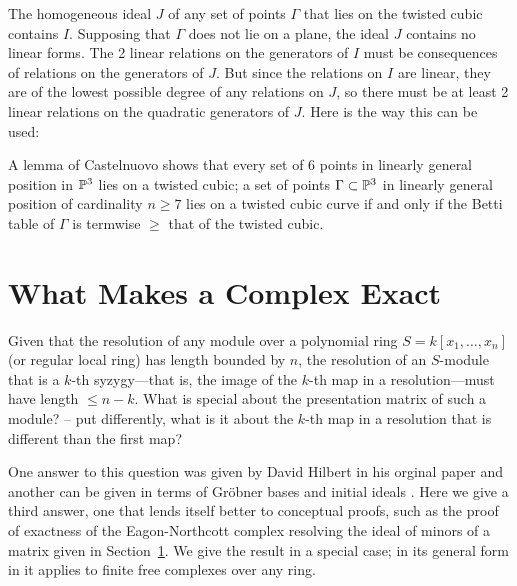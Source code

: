 The homogeneous ideal $J$ of any set of points $\Gamma$ that lies on the twisted cubic contains $I$. Supposing that $\Gamma$ does not lie on a plane, the ideal $J$ contains no linear forms. The 2 linear relations on the generators of $I$ must be consequences of relations on the generators of $J$. But since the relations on $I$ are linear, they are of the lowest possible degree of any relations on $J$, so there must be at least 2 linear relations on the quadratic generators of $J$. Here is the way this can be used:
\begin{fact}
 A lemma of Castelnuovo  shows  that every set of 6 points in linearly general position
in $\PP^{3}$ lies on a twisted cubic;  a set of points $\Gamma\subset \PP^{3}$ in linearly general position of cardinality $n\geq 7$ lies on a twisted cubic curve if and only if
the Betti table of $\Gamma$ is termwise $\geq$ that of the twisted cubic.\end{fact}

\section{What Makes a Complex Exact}

Given that the resolution of any module over a polynomial ring $S = k[x_1,\dots,x_n]$ (or regular local ring) has  length bounded by $n$, the resolution of an $S$-module that is a $k$-th syzygy---that is, the image of the $k$-th map in a resolution---must have length $\leq n-k$. What is special about the presentation matrix of such a module? -- put differently, what is it about the $k$-th map in a resolution that is different than the first map?

One answer to this question was given by David Hilbert in his orginal paper \cite{} and another can be given in terms of Gr\"obner bases and initial ideals \cite{}. Here we give a third answer, one that lends itself better to conceptual proofs, such as the proof of exactness of the Eagon-Northcott complex resolving the ideal of minors of a matrix given in Section~\ref{}. We give the result in a special case; in its general form in \cite{} it applies to finite free complexes over any ring.

